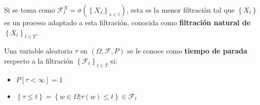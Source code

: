 Si se toma como $\mathcal{F}_{t}^{X} = \sigma (\left\{ X_s \right\}_{s < t})$, esta es la menor filtración tal que $\left\{X_t\right\}$ es un proceso adaptado a esta filtración, conocida como \textbf{filtración natural de }$\left\{X_t\right\}_{t \in T}$.

\begin{boxDef}
	Una variable aleatoria $\tau$ en $(\Omega, \mathcal{F}, P)$ se le conoce como \textbf{tiempo de parada} respecto a la filtración $\left\{ \mathcal{F}_t\right\}_{t\in T}$ si:

	\begin{itemize}
		 \item $P[\tau < \infty] = 1$
		 \item $\left\{ \tau \leq t \right\}  = \left\{ w \in \Omega \vert \tau(w) \leq t \right\}\in \mathcal{F}_t$
	\end{itemize}	

\end{boxDef}